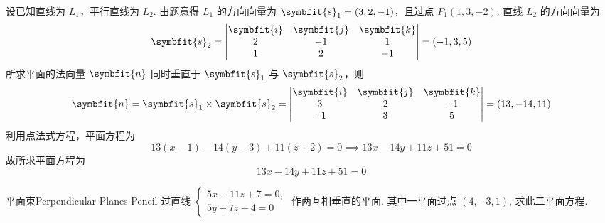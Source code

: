 \begin{solution}
    设已知直线为 $L_1$，平行直线为 $L_2$.
    由题意得 $L_1$ 的方向向量为 $\symbfit{s}_1 = (3, 2, -1)$，且过点 $P_1(1, 3, -2)$.
    直线 $L_2$ 的方向向量为
    \begin{equation*}
        \symbfit{s}_2 = \begin{vmatrix} \symbfit{i} & \symbfit{j} & \symbfit{k} \\ 2 & -1 & 1 \\ 1 & 2 & -1 \end{vmatrix} = (-1, 3, 5)
    \end{equation*}
    所求平面的法向量 $\symbfit{n}$ 同时垂直于 $\symbfit{s}_1$ 与 $\symbfit{s}_2$，则
    \begin{equation*}
        \symbfit{n} = \symbfit{s}_1 \times \symbfit{s}_2 = \begin{vmatrix} \symbfit{i} & \symbfit{j} & \symbfit{k} \\ 3 & 2 & -1 \\ -1 & 3 & 5 \end{vmatrix} = (13, -14, 11)
    \end{equation*}
    利用点法式方程，平面方程为
    \begin{equation*}
        13(x - 1) - 14(y - 3) + 11(z + 2) = 0 \implies 13x - 14y + 11z + 51 = 0
    \end{equation*}
    故所求平面方程为
    \begin{equation*}
        \boxed{13x - 14y + 11z + 51 = 0}
    \end{equation*}
\end{solution}

\begin{problem}{平面束}{Perpendicular-Planes-Pencil}
    过直线 $\begin{cases} 5x - 11z + 7 = 0, \\ 5y + 7z - 4 = 0 \end{cases}$ 作两互相垂直的平面. 其中一平面过点 $(4, -3, 1)$, 求此二平面方程.
\end{problem}

